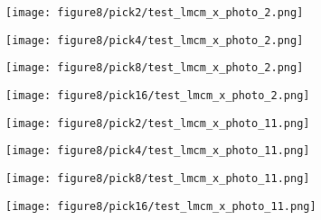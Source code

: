 \begin{figure*}[htbp]
    
    \begin{minipage}{0.21\textwidth}
        \texttt{[image: figure8/pick2/test\_lmcm\_x\_photo\_2.png]}
    \end{minipage}\hspace{0.1cm}%
    \begin{minipage}{0.21\textwidth}
        \texttt{[image: figure8/pick4/test\_lmcm\_x\_photo\_2.png]}
    \end{minipage}\hspace{0.1cm}%
    \begin{minipage}{0.21\textwidth}
        \texttt{[image: figure8/pick8/test\_lmcm\_x\_photo\_2.png]}
    \end{minipage}\hspace{0.1cm}%
    \begin{minipage}{0.21\textwidth}
        \texttt{[image: figure8/pick16/test\_lmcm\_x\_photo\_2.png]}
    \end{minipage}\hspace{0.1cm}%

    \vspace{-0.1cm}

    \begin{minipage}{0.21\textwidth}
        \texttt{[image: figure8/pick2/test\_lmcm\_x\_photo\_11.png]}
    \end{minipage}\hspace{0.1cm}%
    \begin{minipage}{0.21\textwidth}
        \texttt{[image: figure8/pick4/test\_lmcm\_x\_photo\_11.png]}
    \end{minipage}\hspace{0.1cm}%
    \begin{minipage}{0.21\textwidth}
        \texttt{[image: figure8/pick8/test\_lmcm\_x\_photo\_11.png]}
    \end{minipage}\hspace{0.1cm}%
    \begin{minipage}{0.21\textwidth}
        \texttt{[image: figure8/pick16/test\_lmcm\_x\_photo\_11.png]}
    \end{minipage}\hspace{0.1cm}%

    \vspace{-0.1cm}



\end{figure*}
